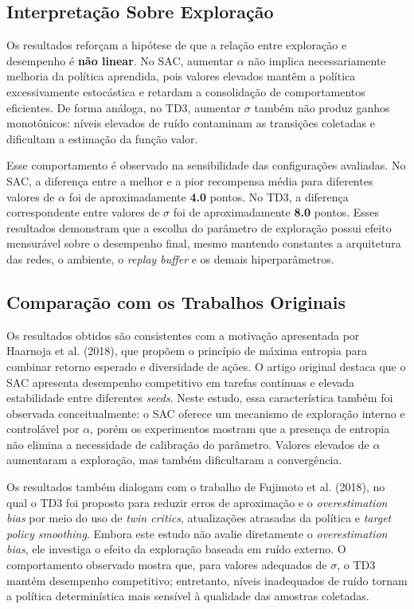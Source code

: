 \documentclass{Supervised_Reinforcement_Learningqsport}
\begin{document}
\subsection{Interpretação Sobre Exploração}

Os resultados reforçam a hipótese de que a relação entre exploração e desempenho é \textbf{não linear}. No SAC, aumentar $\alpha$ não implica necessariamente melhoria da política aprendida, pois valores elevados mantêm a política excessivamente estocástica e retardam a consolidação de comportamentos eficientes. De forma análoga, no TD3, aumentar $\sigma$ também não produz ganhos monotônicos: níveis elevados de ruído contaminam as transições coletadas e dificultam a estimação da função valor.

Esse comportamento é observado na sensibilidade das configurações avaliadas. No SAC, a diferença entre a melhor e a pior recompensa média para diferentes valores de $\alpha$ foi de aproximadamente \textbf{4.0} pontos. No TD3, a diferença correspondente entre valores de $\sigma$ foi de aproximadamente \textbf{8.0} pontos. Esses resultados demonstram que a escolha do parâmetro de exploração possui efeito mensurável sobre o desempenho final, mesmo mantendo constantes a arquitetura das redes, o ambiente, o \textit{replay buffer} e os demais hiperparâmetros.

\subsection{Comparação com os Trabalhos Originais}

Os resultados obtidos são consistentes com a motivação apresentada por Haarnoja et al. (2018), que propõem o princípio de máxima entropia para combinar retorno esperado e diversidade de ações. O artigo original destaca que o SAC apresenta desempenho competitivo em tarefas contínuas e elevada estabilidade entre diferentes \textit{seeds}. Neste estudo, essa característica também foi observada conceitualmente: o SAC oferece um mecanismo de exploração interno e controlável por $\alpha$, porém os experimentos mostram que a presença de entropia não elimina a necessidade de calibração do parâmetro. Valores elevados de $\alpha$ aumentaram a exploração, mas também dificultaram a convergência.

Os resultados também dialogam com o trabalho de Fujimoto et al. (2018), no qual o TD3 foi proposto para reduzir erros de aproximação e o \textit{overestimation bias} por meio do uso de \textit{twin critics}, atualizações atrasadas da política e \textit{target policy smoothing}. Embora este estudo não avalie diretamente o \textit{overestimation bias}, ele investiga o efeito da exploração baseada em ruído externo. O comportamento observado mostra que, para valores adequados de $\sigma$, o TD3 mantém desempenho competitivo; entretanto, níveis inadequados de ruído tornam a política determinística mais sensível à qualidade das amostras coletadas.
\end{document}
